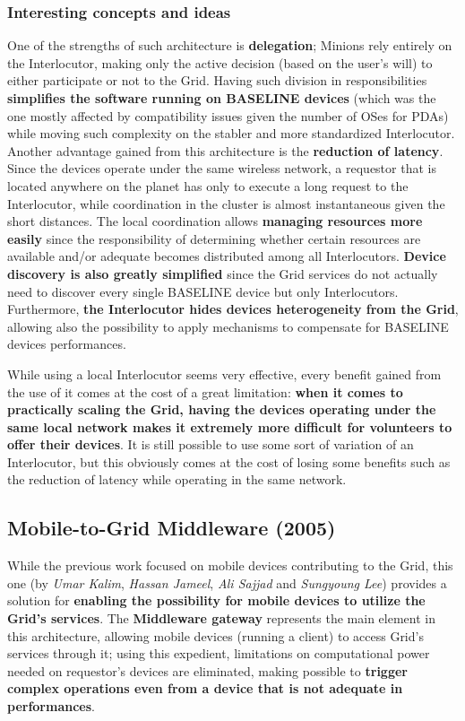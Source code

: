 \subsubsection{Interesting concepts and ideas}
One of the strengths of such architecture is \textbf{delegation}; Minions rely entirely on the Interlocutor, making only the active decision (based on the user's will) to either participate or not to the Grid. Having such division in responsibilities \textbf{simplifies the software running on BASELINE devices} (which was the one mostly affected by compatibility issues given the number of OSes for PDAs) while moving such complexity on the stabler and more standardized Interlocutor.
Another advantage gained from this architecture is the \textbf{reduction of latency}. Since the devices operate under the same wireless network, a requestor that is located anywhere on the planet has only to execute a long request to the Interlocutor, while coordination in the cluster is almost instantaneous given the short distances.
The local coordination allows \textbf{managing resources more easily} since the responsibility of determining whether certain resources are available and/or adequate becomes distributed among all Interlocutors.
\textbf{Device discovery is also greatly simplified} since the Grid services do not actually need to discover every single BASELINE device but only Interlocutors.
Furthermore, \textbf{the Interlocutor hides devices heterogeneity from the Grid}, allowing also the possibility to apply mechanisms to compensate for BASELINE devices performances.

While using a local Interlocutor seems very effective, every benefit gained from the use of it comes at the cost of a great limitation: \textbf{when it comes to practically scaling the Grid, having the devices operating under the same local network makes it extremely more difficult for volunteers to offer their devices}. It is still possible to use some sort of variation of an Interlocutor, but this obviously comes at the cost of losing some benefits such as the reduction of latency while operating in the same network.

\subsection{Mobile-to-Grid Middleware (2005)}\label{mobile_to_grid_middleware}
While the previous work focused on mobile devices contributing to the Grid, this one (by \textit{Umar Kalim}, \textit{Hassan Jameel}, \textit{Ali Sajjad} and \textit{Sungyoung Lee}) provides a solution for \textbf{enabling the possibility for mobile devices to utilize the Grid's services}.
The \textbf{Middleware gateway} represents the main element in this architecture, allowing mobile devices (running a client) to access Grid's services through it; using this expedient, limitations on computational power needed on requestor's devices are eliminated, making possible to \textbf{trigger complex operations even from a device that is not adequate in performances}.

